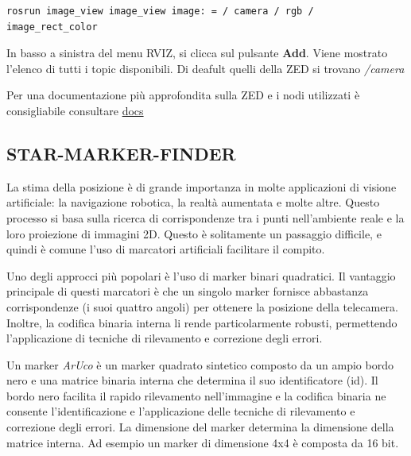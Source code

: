 \documentclass[a4paper]{article}
\begin{document}
\begin{verbatim}
rosrun image_view image_view image: = / camera / rgb / image_rect_color
\end{verbatim}
In basso a sinistra del menu RVIZ, si clicca sul pulsante \textbf{Add}. Viene mostrato l'elenco di tutti i topic disponibili. Di deafult quelli della ZED si trovano \textit{/camera}
 





Per una documentazione più approfondita sulla ZED e i nodi utilizzati è consigliabile consultare 
\textcolor{red}{\href{https://www.stereolabs.com/docs/getting-started/}{docs}}

\subsection{STAR-MARKER-FINDER}
La stima della posizione è di grande importanza in molte applicazioni di visione artificiale: la navigazione robotica, la realtà aumentata e molte altre. Questo processo si basa sulla ricerca di corrispondenze tra i punti nell'ambiente reale e la loro proiezione di immagini 2D. Questo è solitamente un passaggio difficile, e quindi è comune l'uso di marcatori artificiali facilitare il compito.

Uno degli approcci più popolari è l'uso di marker binari quadratici. Il vantaggio principale di questi marcatori è che un singolo marker fornisce abbastanza corrispondenze (i suoi quattro angoli) per ottenere la posizione della telecamera. Inoltre, la codifica binaria interna li rende particolarmente robusti, permettendo l'applicazione di tecniche di rilevamento e correzione degli errori.

Un marker \textit{ArUco} è un marker quadrato sintetico composto da un ampio bordo nero e una matrice binaria interna che determina il suo identificatore (id). Il bordo nero facilita il rapido rilevamento nell'immagine e la codifica binaria ne consente l'identificazione e l'applicazione delle tecniche di rilevamento e correzione degli errori. La dimensione del marker determina la dimensione della matrice interna. Ad esempio un marker di dimensione 4x4 è composta da 16 bit.
\end{document}
